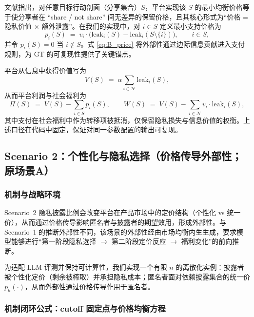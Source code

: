 文献指出，对任意目标行动剖面（分享集合）$S$，平台实现该 $S$ 的最小均衡价格等于使分享者在 ``share / not share'' 间无差异的保留价格，且其核心形式为“价格 = 隐私价值 $\times$ 额外泄露”。在我们的实现中，对 $i\in S$ 定义最小支持价格为
\begin{equation}
p_i(S) \;=\; v_i\cdot \Big(\mathrm{leak}_i(S)-\mathrm{leak}_i(S\setminus\{i\})\Big),\qquad i\in S,
\label{eq:B_price}
\end{equation}
并令 $p_i(S)=0$ 当 $i\notin S$。式 \eqref{eq:B_price} 将外部性通过边际信息贡献进入支付规则，为 GT 的可复现性提供了关键锚点。

平台从信息中获得价值写为
\begin{equation}
V(S) \;=\; \alpha \sum_{i\in\mathcal{N}} \mathrm{leak}_i(S),
\label{eq:B_value}
\end{equation}
从而平台利润与社会福利为
\begin{equation}
\Pi(S) \;=\; V(S) - \sum_{i\in S} p_i(S),
\qquad
W(S) \;=\; V(S) - \sum_{i\in\mathcal{N}} v_i\cdot \mathrm{leak}_i(S),
\label{eq:B_profit_welfare}
\end{equation}
其中支付在社会福利中作为转移项被抵消，仅保留隐私损失与信息价值的权衡。上述口径在代码中固定，保证对同一参数配置的输出可复现。

\subsection{Scenario 2：个性化与隐私选择（价格传导外部性；原场景A）}
\label{subsec:scenarioA}

\subsubsection{机制与战略环境}
\label{subsubsec:A_game}

Scenario~2 隐私披露比例会改变平台在产品市场中的定价结构（个性化 vs 统一价），从而通过价格传导影响匿名者与披露者的期望效用，形成外部性。与 Scenario~1 的推断外部性不同，该场景的外部性经由市场均衡内生生成，要求模型能够进行“第一阶段隐私选择 $\rightarrow$ 第二阶段定价反应 $\rightarrow$ 福利变化”的前向推断。

为适配 LLM 评测并保持可计算性，我们实现一个有限 $n$ 的离散化实例：披露者被个性化定价（剩余被榨取）并承担隐私成本；匿名者面对依赖披露集合的统一价 $p_u(\cdot)$，从而外部性通过价格传导作用于匿名者。

\subsubsection{机制闭环公式：cutoff 固定点与价格均衡方程}
\label{subsubsec:A_formula}

